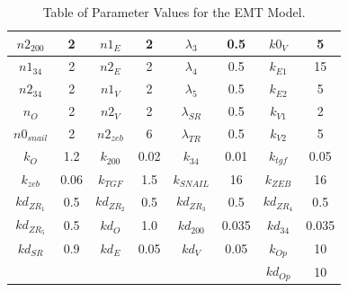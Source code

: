 \documentclass{article}
\begin{document}
\begin{table}
\begin{tabular}{|c|c|c|c|c|c|c|c|}
		\hline
		{\footnotesize{}$n2_{200}$ } & {\footnotesize{}2 } & {\footnotesize{}$n1_{E}$ } & {\footnotesize{}2 } & {\footnotesize{}$\lambda_{3}$ } & {\footnotesize{}0.5 } & {\footnotesize{}$k0_{V}$ } & {\footnotesize{}5}\tabularnewline
		\hline
		{\footnotesize{}$n1_{34}$ } & {\footnotesize{}2 } & {\footnotesize{}$n2_{E}$ } & {\footnotesize{}2 } & {\footnotesize{}$\lambda_{4}$ } & {\footnotesize{}0.5 } & {\footnotesize{}$k_{E1}$ } & {\footnotesize{}15}\tabularnewline
		\hline
		{\footnotesize{}$n2_{34}$ } & {\footnotesize{}2 } & {\footnotesize{}$n1_{V}$ } & {\footnotesize{}2 } & {\footnotesize{}$\lambda_{5}$ } & {\footnotesize{}0.5 } & {\footnotesize{}$k_{E2}$ } & {\footnotesize{}5}\tabularnewline
		\hline
		{\footnotesize{}$n_{O}$ } & {\footnotesize{}2 } & {\footnotesize{}$n2_{V}$ } & {\footnotesize{}2 } & {\footnotesize{}$\lambda_{SR}$ } & {\footnotesize{}0.5 } & {\footnotesize{}$k_{V1}$ } & {\footnotesize{}2}\tabularnewline
		\hline
		{\footnotesize{}$n0_{snail}$ } & {\footnotesize{}2 } & {\footnotesize{}$n2_{zeb}$ } & {\footnotesize{}6 } & {\footnotesize{}$\lambda_{TR}$ } & {\footnotesize{}0.5 } & {\footnotesize{}$k_{V2}$ } & {\footnotesize{}5}\tabularnewline
		\hline
		{\footnotesize{}$k_{O}$ } & {\footnotesize{}1.2 } & {\footnotesize{}$k_{200}$ } & {\footnotesize{}0.02 } & {\footnotesize{}$k_{34}$ } & {\footnotesize{}0.01 } & {\footnotesize{}$k_{tgf}$ } & {\footnotesize{}0.05}\tabularnewline
		\hline
		{\footnotesize{}$k_{zeb}$ } & {\footnotesize{}0.06 } & {\footnotesize{}$k_{TGF}$ } & {\footnotesize{}1.5 } & {\footnotesize{}$k_{SNAIL}$ } & {\footnotesize{}16 } & {\footnotesize{}$k_{ZEB}$ } & {\footnotesize{}16}\tabularnewline
		\hline
		{\footnotesize{}$kd_{ZR_{1}}$ } & {\footnotesize{}0.5 } & {\footnotesize{}$kd_{ZR_{2}}$ } & {\footnotesize{}0.5 } & {\footnotesize{}$kd_{ZR_{3}}$ } & {\footnotesize{}0.5 } & {\footnotesize{}$kd_{ZR_{4}}$ } & {\footnotesize{}0.5}\tabularnewline
		\hline
		{\footnotesize{}$kd_{ZR_{5}}$ } & {\footnotesize{}0.5 } & {\footnotesize{}$kd_{O}$ } & {\footnotesize{}1.0 } & {\footnotesize{}$kd_{200}$ } & {\footnotesize{}0.035 } & {\footnotesize{}$kd_{34}$ } & {\footnotesize{}0.035}\tabularnewline
		\hline
		{\footnotesize{}$kd_{SR}$ } & {\footnotesize{}0.9 } & {\footnotesize{}$kd_{E}$ } & {\footnotesize{}0.05 } & {\footnotesize{}$kd_{V}$ } & {\footnotesize{}0.05 } & $k_{Op}$ & 10\tabularnewline
		\hline
		&  &  &  &  &  & $kd_{Op}$ & 10\tabularnewline
		\hline
	\end{tabular} \caption{Table of Parameter Values for the EMT Model.\label{tab:params}}
\end{table}
\end{document}
